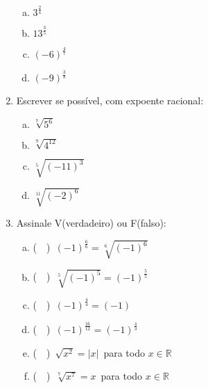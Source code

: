 \documentclass[a4paper,14pt]{article}
\begin{document}
\begin{multicols}{2}
\begin{enumerate}
        \begin{enumerate}[a)] 
        	\item $3^\frac{2}{4}$ \\
        	\item $13^\frac{3}{5}$ \\
        	\item $(-6)^\frac{4}{7}$ \\
        	\item $(-9)^\frac{3}{8}$ \\
        \end{enumerate}
        \item Escrever se possível, com expoente racional:
        \begin{enumerate}[a)]
        	\item $\sqrt[7]{5^6}$ \\
        	\item $\sqrt[9]{4^{12}}$ \\
        	\item $\sqrt[5]{(-11)^3}$ \\
        	\item $\sqrt[11]{(-2)^6}$ \\
        \end{enumerate}
        \item Assinale V(verdadeiro) ou F(falso):
        \begin{enumerate}[a)]
        	\item (~~)~$(-1)^\frac{6}{6} = \sqrt[6]{(-1)^6}$ \\
        	\item (~~)~$\sqrt[5]{(-1)^5} = (-1)^\frac{5}{5}$ \\
        	\item (~~)~$(-1)^\frac{4}{4} = (-1)$ \\
        	\item (~~)~$(-1)^\frac{16}{12} = (-1)^\frac{4}{3}$ \\
        	\item (~~)~$\sqrt{x^2} = |x|$~para todo $x \in \mathbb{R}$ \\
        	\item (~~)~$\sqrt[7]{x^7} = x$~para todo $x \in \mathbb{R}$ \\
        \end{enumerate}
    \end{enumerate}        
    \end{multicols}    
\end{document}
